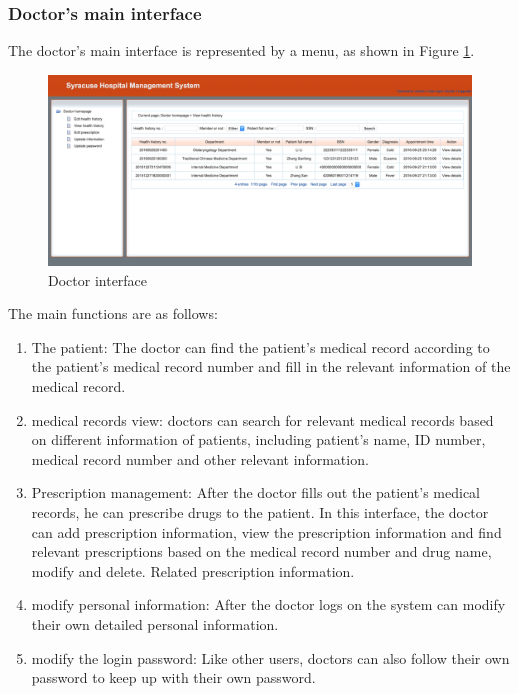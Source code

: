 \subsubsection{Doctor's main interface}
The doctor's main interface is represented by a menu, as shown in Figure \ref{fig:p10}.
\begin{figure}[H]
    \centering
    \includegraphics[width=\textwidth]{10.png}
    \caption{Doctor interface}
    \label{fig:p10}
\end{figure}
The main functions are as follows:
\begin{enumerate}
    \item The patient: The doctor can find the patient's medical record according to the patient's medical record number and fill in the relevant information of the medical record.
    \item medical records view: doctors can search for relevant medical records based on different information of patients, including patient's name, ID number, medical record number and other relevant information.
    \item Prescription management: After the doctor fills out the patient's medical records, he can prescribe drugs to the patient. In this interface, the doctor can add prescription information, view the prescription information and find relevant prescriptions based on the medical record number and drug name, modify and delete. Related prescription information.
    \item modify personal information: After the doctor logs on the system can modify their own detailed personal information.
    \item modify the login password: Like other users, doctors can also follow their own password to keep up with their own password.
\end{enumerate}

